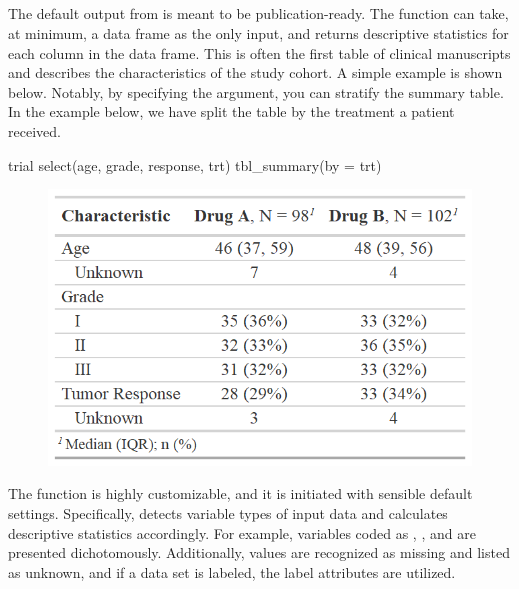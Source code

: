 \newpage


\subsection{\texorpdfstring{}{tbl\_summary()}}

The default output from  is meant to be publication-ready.
The  function can take, at minimum, a data frame as the only input, and returns descriptive statistics for each column in the data frame.
This is often the first table of clinical manuscripts and describes the characteristics of the study cohort.
A simple example is shown below.
Notably, by specifying the  argument, you can stratify the summary table.
In the example below, we have split the table by the treatment a patient received.

\begin{example}
trial %
  select(age, grade, response, trt) %
  tbl_summary(by = trt)
\end{example}
\begin{figure}[h!]
  \includegraphics[scale=0.73]{summary_basic.png}
  \centering
\end{figure}

The function is highly customizable, and it is initiated with sensible default settings.
Specifically,  detects variable types of input data and calculates descriptive statistics accordingly.
For example, variables coded as , , and  are presented dichotomously.
Additionally,  values are recognized as missing and listed as unknown, and if a data set is labeled, the label attributes are utilized.

